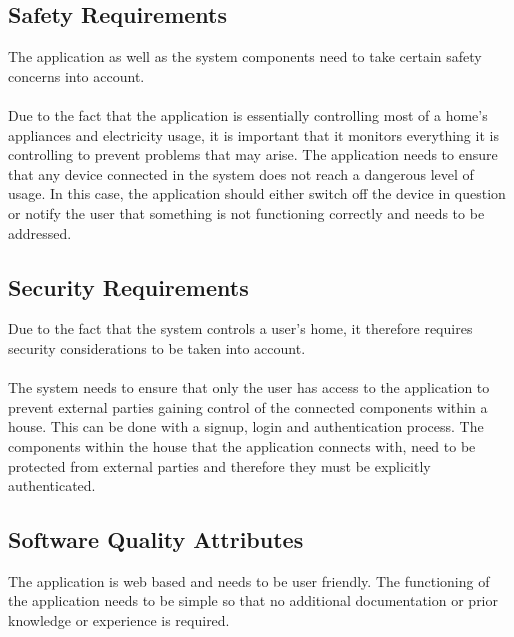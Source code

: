 \documentclass[11pt, a4paper]{article}
\begin{document}
	\subsection{Safety Requirements} 
	The application as well as the system components need to take certain safety concerns into account. 
	\\\\
	Due to the fact that the application is essentially controlling most of a home's appliances and electricity usage, it is important that it monitors everything it is controlling to prevent problems that may arise. The application needs to ensure that any device connected in the system does not reach a dangerous level of usage. In this case, the application should either switch off the device in question or notify the user that something is not functioning correctly and needs to be addressed. 
	
	\subsection{Security Requirements}
	Due to the fact that the system controls a user's home, it therefore requires security considerations to be taken into account.
	\\\\
	The system needs to ensure that only the user has access to the application to prevent external parties gaining control of the connected components within a house. This can be done with a signup, login and authentication process. 
	The components within the house that the application connects with, need to be protected from external parties and therefore they must be explicitly authenticated. 
	
	\subsection{Software Quality Attributes}
	The application is web based and needs to be user friendly. The functioning of the application needs to be simple so that no additional documentation or prior knowledge or experience is required. 
	
	
\end{document}
